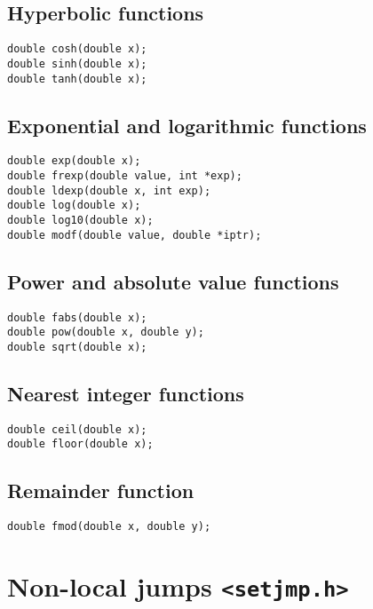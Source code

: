 \documentclass[a4paper,11pt,draft]{article}
\begin{document}
\subsection*{Hyperbolic functions}

\begin{verbatim}
double cosh(double x);
double sinh(double x);
double tanh(double x);
\end{verbatim}

\subsection*{Exponential and logarithmic functions}

\begin{verbatim}
double exp(double x);
double frexp(double value, int *exp);
double ldexp(double x, int exp);
double log(double x);
double log10(double x);
double modf(double value, double *iptr);
\end{verbatim}

\subsection*{Power and absolute value functions}

\begin{verbatim}
double fabs(double x);
double pow(double x, double y);
double sqrt(double x);
\end{verbatim}

\subsection*{Nearest integer functions}

\begin{verbatim}
double ceil(double x);
double floor(double x);
\end{verbatim}

\subsection*{Remainder function}

\begin{verbatim}
double fmod(double x, double y);
\end{verbatim}

\section*{Non-local jumps {\tt <setjmp.h>}}
\end{document}
